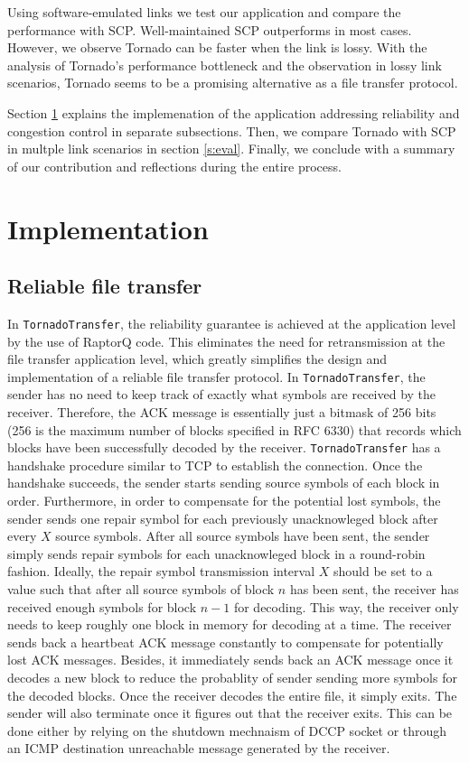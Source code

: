 \documentclass{sig-alternate-10pt}
\begin{document}
Using software-emulated links we test our application and compare the
performance with SCP. Well-maintained SCP outperforms in most cases. However, we
observe Tornado can be faster when the link is lossy. With the analysis of
Tornado's performance bottleneck and the observation in lossy link scenarios,
Tornado seems to be a promising alternative as a file transfer protocol.

Section \ref{s:impl} explains the implemenation of the application addressing
reliability and congestion control in separate subsections. Then, we compare
Tornado with SCP in multple link scenarios in section \ref{s:eval}. Finally,
we conclude with a summary of our contribution and reflections during the entire
process.

\section{Implementation}\label{s:impl}

\subsection{Reliable file transfer}

In \texttt{TornadoTransfer}, the reliability guarantee is achieved at the application level by the use of RaptorQ code. This eliminates the need for retransmission at the file transfer application level, which greatly simplifies the design and implementation of a reliable file transfer protocol. In \texttt{TornadoTransfer}, the sender has no need to keep track of exactly what symbols are received by the receiver. Therefore, the ACK message is essentially just a bitmask of 256 bits (256 is the maximum number of blocks specified in RFC 6330) that records which blocks have been successfully decoded by the receiver. \texttt{TornadoTransfer} has a handshake procedure similar to TCP to establish the connection. Once the handshake succeeds, the sender starts sending source symbols of each block in order. Furthermore, in order to compensate for the potential lost symbols, the sender sends one repair symbol for each previously unacknowleged block after every $X$ source symbols. After all source symbols have been sent, the sender simply sends repair symbols for each unacknowleged block in a round-robin fashion. Ideally, the repair symbol transmission interval $X$ should be set to a value such that after all source symbols of block $n$ has been sent, the receiver has received enough symbols for block $n-1$ for decoding. This way, the receiver only needs to keep roughly one block in memory for decoding at a time. The receiver sends back a heartbeat ACK message constantly to compensate for potentially lost ACK messages. Besides, it immediately sends back an ACK message once it decodes a new block to reduce the probablity of sender sending more symbols for the decoded blocks. Once the receiver decodes the entire file, it simply exits. The sender will also terminate once it figures out that the receiver exits. This can be done either by relying on the shutdown mechnaism of DCCP socket or through an ICMP destination unreachable message generated by the receiver.
\end{document}
